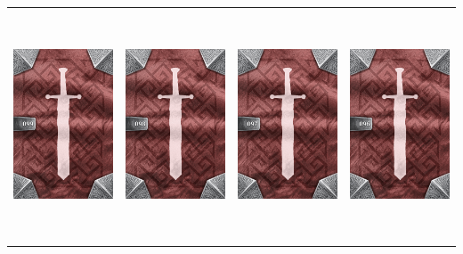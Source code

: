\documentclass{minimal}
\begin{document}
{\begin{longtable}{llll}
\includegraphics[width=44mm,height=68mm]{./64-151/gh-099-magma-waders-back.png} &
\includegraphics[width=44mm,height=68mm]{./64-151/gh-098-drakescale-boots-back.png} &
\includegraphics[width=44mm,height=68mm]{./64-151/gh-097-endurance-footwraps-back.png} &
\includegraphics[width=44mm,height=68mm]{./64-151/gh-096-rocket-boots-back.png}\\ 

\end{longtable}}
\end{document}
